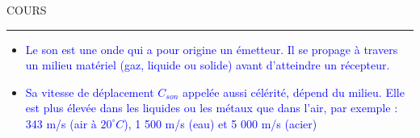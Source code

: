 \documentclass[11pt,a4paper]{article}
\begin{document}
\begin{center}
\LARGE{COURS}
\end{center}




\hrule

\vspace{1cm}



\vspace{2mm}
\begin{itemize}
    \item \textcolor{blue}{Le son est une onde qui a pour origine un émetteur. Il se propage à travers un milieu matériel (gaz, liquide ou solide) avant d'atteindre un récepteur. }
    \item \textcolor{blue}{Sa vitesse de déplacement $C_{son}$ appelée aussi célérité, dépend du milieu. Elle est plus élevée dans les liquides ou les métaux que dans l'air, par exemple : 343 m/s (air à $20^\circ C$), 1 500 m/s (eau) et 5 000 m/s (acier)}
\end{itemize}
\end{document}
